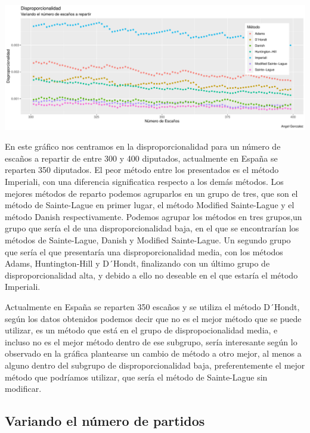\documentclass[12pt,a4paper,]{book}
\numberwithin{dummy}{section}
\theoremstyle{ocrenumbox}
\theoremstyle{blacknumex}
\theoremstyle{blacknumbox}
\theoremstyle{ocrenum}
\theoremstyle{ocrenum}
\begin{document}
\begin{center}\includegraphics[width=0.95\linewidth]{figurasR/unnamed-chunk-43-1} \end{center}

En este gráfico nos centramos en la disproporcionalidad para un número
de escaños a repartir de entre 300 y 400 diputados, actualmente en
España se reparten 350 diputados. El peor método entre los presentados
es el método Imperiali, con una diferencia significatica respecto a los
demás métodos. Los mejores métodos de reparto podemos agruparlos en un
grupo de tres, que son el método de Sainte-Lague en primer lugar, el
método Modified Sainte-Lague y el método Danish respectivamente. Podemos
agrupar los métodos en tres grupos,un grupo que sería el de una
disproporcionalidad baja, en el que se encontrarían los métodos de
Sainte-Lague, Danish y Modified Sainte-Lague. Un segundo grupo que sería
el que presentaría una disproporcionalidad media, con los métodos Adams,
Huntington-Hill y D´Hondt, finalizando con un último grupo de
disproporcionalidad alta, y debido a ello no deseable en el que estaría
el método Imperiali.

Actualmente en España se reparten 350 escaños y se utiliza el método
D´Hondt, según los datos obtenidos podemos decir que no es el mejor
método que se puede utilizar, es un método que está en el grupo de
dispropocionalidad media, e incluso no es el mejor método dentro de ese
subgrupo, sería interesante según lo observado en la gráfica plantearse
un cambio de método a otro mejor, al menos a alguno dentro del subgrupo
de disproporcionalidad baja, preferentemente el mejor método que
podríamos utilizar, que sería el método de Sainte-Lague sin modificar.

\hypertarget{variando-el-nuxfamero-de-partidos}{%
\subsection{Variando el número de
partidos}\label{variando-el-nuxfamero-de-partidos}}
\end{document}
